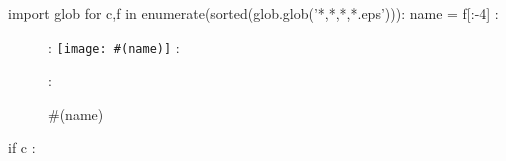 \documentclass[a4]{article}
\begin{document}
{%
import glob
for c,f in enumerate(sorted(glob.glob('*,*,*,*.eps'))):
    name = f[:-4]
    : \begin{figure}[p]
    : \texttt{[image: \#(name)]}
    : \caption{#(name)}
    : \end{figure}
    if c%
        : \clearpage
}%
\end{document}
